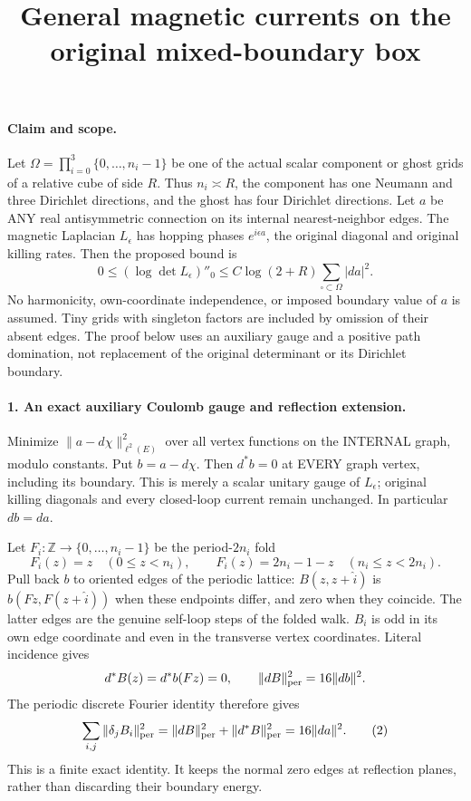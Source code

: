 \documentclass[11pt]{article}
\title{General magnetic currents on the original mixed-boundary box}\author{}\date{}
\begin{document}
\maketitle
\paragraph{Claim and scope.}
Let $\Omega=\prod_{i=0}^3\{0,\ldots,n_i-1\}$ be one of the actual
scalar component or ghost grids of a relative cube of side $R$.
Thus $n_i\asymp R$, the component has one Neumann and three Dirichlet
directions, and the ghost has four Dirichlet directions. Let $a$
be ANY real antisymmetric connection on its internal nearest-neighbor
edges. The magnetic Laplacian $L_\epsilon$ has hopping phases
$e^{i\epsilon a}$, the original diagonal and original killing rates.
Then the proposed bound is
\[
 0\le(\log\det L_\epsilon)''_0
                   \le C\log(2+R)\sum_{\square\subset\Omega}|da|^2 .
                                                               \tag{1}
\]
No harmonicity, own-coordinate independence, or imposed boundary
value of $a$ is assumed. Tiny grids with singleton factors are included
by omission of their absent edges. The proof below uses an auxiliary
gauge and a positive path domination, not replacement of the original
determinant or its Dirichlet boundary.

\paragraph{1. An exact auxiliary Coulomb gauge and reflection extension.}
Minimize $\|a-d\chi\|_{\ell^2(E)}^2$ over all vertex functions on the
INTERNAL graph, modulo constants. Put $b=a-d\chi$. Then
$d^*b=0$ at EVERY graph vertex, including its boundary.
This is merely a scalar unitary gauge of $L_\epsilon$; original
killing diagonals and every closed-loop current remain unchanged.
In particular $db=da$.

Let $F_i:\mathbb Z\to\{0,\ldots,n_i-1\}$ be the period-$2n_i$ fold
\[
 F_i(z)=z\quad(0\le z<n_i),\qquad
 F_i(z)=2n_i-1-z\quad(n_i\le z<2n_i).
\]
Pull back $b$ to oriented edges of the periodic lattice:
$B(z,z+\hat i)$ is $b(Fz,F(z+\hat i))$ when these endpoints differ,
and zero when they coincide. The latter edges are the genuine
self-loop steps of the folded walk. $B_i$ is odd in its own edge
coordinate and even in the transverse vertex coordinates.
Literal incidence gives
\[
 d^*B(z)=d^*b(Fz)=0,\qquad
 \|dB\|_{\rm per}^2=16\|db\|^2.
\]
The periodic discrete Fourier identity therefore gives
\[
 \sum_{i,j}\|\delta_jB_i\|_{\rm per}^2
       =\|dB\|_{\rm per}^2+\|d^*B\|_{\rm per}^2
       =16\|da\|^2.                                         \tag{2}
\]
This is a finite exact identity. It keeps the normal zero edges
at reflection planes, rather than discarding their boundary energy.
\end{document}
